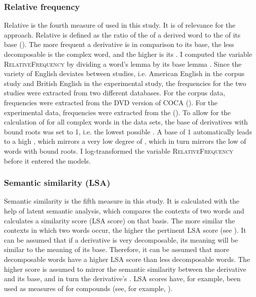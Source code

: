 \subsubsection{Relative frequency} 
Relative  is the fourth measure of  used in this study. It is of relevance for the  approach. Relative  is defined as the ratio of the  of a derived word to the  of its base (\citealt{Hay.2003}). The more frequent a derivative is in comparison to its base, the less decomposable is the complex word, and the higher is its . 
I computed the variable \textsc{RelativeFrequency} by dividing a word's lemma  by its base lemma . Since the variety of English deviates between studies, i.e. American English in the corpus study and British English in the experimental study, the frequencies for the two studies were extracted from two different databases. For the corpus data, frequencies were extracted from the DVD  version of  {COCA} (\citealt{Davies.20082014}). For the experimental data, frequencies were extracted from the  (\citealt{Davies.2004}).
To allow for the calculation of  for all complex words in the data sets, the base  of derivatives with bound roots was set to 1, i.e. the lowest possible . A base  of 1 automatically leads to a high , which mirrors a very low degree of , which in turn mirrors the low  of words with bound roots. 
I log-transformed the variable \textsc{RelativeFrequency}  before it entered the models.

\subsubsection{Semantic similarity (LSA)} 
Semantic similarity is the fifth  measure in this study. It is calculated with the help of latent semantic analysis, which compares the contexts of two words and calculates a similarity score (LSA score) on that basis. The more similar the contexts in which two words occur, the higher the pertinent  LSA score (see \citealt{Landauer.1998}). It can be assumed that if a derivative is very decomposable, its meaning will be similar to the meaning of its base. Therefore, it can be assumed that more decomposable words have a higher LSA score than  less decomposable words. The higher score is assumed to mirror the semantic similarity between the derivative and its base, and in turn the derivative's . LSA scores have, for example, been used as measures of  for compounds (see, for example, \citealt{Wang.2014, Gagne.2016}).

